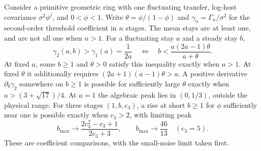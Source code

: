 \begin{proposition}
\label{prop:exact-mem-ring}
Consider a primitive geometric ring with one fluctuating transfer,
log-host covariance $\sigma^2\phi^j$, and $0<\phi<1$.
Write $\theta=\phi/(1-\phi)$ and $\gamma_n=\Gamma_n/\sigma^2$ for
the second-order threshold coefficient in $n$ stages. The mean stays
are at least one, and are not all one when $n>1$.
For a fluctuating stay $a$ and a steady stay $b$,
\begin{equation}
 \gamma_2(a,b)>\gamma_1(a)=\frac1{2a}
 \quad\Longleftrightarrow\quad
 b<\frac{a(2a-1)\theta}{a+\theta}.
 \label{eq:exact-mem-add}
\end{equation}
At fixed $a$, some $b\geq1$ and $\theta>0$ satisfy this inequality
exactly when $a>1$. At fixed $\theta$ it additionally requires
$(2a+1)(a-1)\theta>a$.
A positive derivative $\partial_b\gamma_2$ somewhere on $b\geq1$
is possible for sufficiently large $\theta$ exactly when
$a>(3+\sqrt{17})/4$. At $a=1$ the algebraic peak lies in $(0,1/3)$,
outside the physical range. For three stages $(1,b,c_3)$, a rise at
short $b\geq1$ for $\phi$ sufficiently near one is possible exactly
when $c_3>2$, with limiting peak
\begin{equation}
 b_{\max}\longrightarrow\frac{2c_3^2-c_3+1}{2c_3+3},
 \qquad b_{\max}\longrightarrow\frac{46}{13}\quad(c_3=5).
 \label{eq:exact-mem-third-peak}
\end{equation}
These are coefficient comparisons, with the small-noise limit taken first.
\end{proposition}


